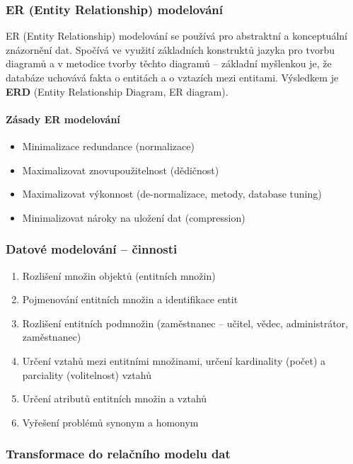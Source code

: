 \documentclass[12pt,a4paper]{article}
\begin{document}
\subsubsection{ER (Entity Relationship) modelování}

ER (Entity Relationship) modelování se používá pro abstraktní a konceptuální znázornění dat.
Spočívá ve využití základních konstruktů jazyka pro tvorbu diagramů a v metodice tvorby těchto
diagramů -- základní myšlenkou je, že databáze uchovává fakta o entitách a o vztazích mezi entitami.
Výsledkem je \textbf{ERD} (Entity Relationship Diagram, ER diagram).

\paragraph{Zásady ER modelování}
\begin{itemize}
  \item Minimalizace redundance (normalizace)
  \item Maximalizovat znovupoužitelnost (dědičnost)
  \item Maximalizovat výkonnost (de-normalizace, metody, database tuning)
  \item Minimalizovat nároky na uložení dat (compression)
\end{itemize}

\subsubsection{Datové modelování -- činnosti}

\begin{enumerate}
  \item Rozlišení množin objektů (entitních množin)
  \item Pojmenování entitních množin a identifikace entit
  \item Rozlišení entitních podmnožin (zaměstnanec -- učitel, vědec, administrátor, zaměstnanec)
  \item Určení vztahů mezi entitními množinami, určení kardinality (počet) a parciality
    (volitelnost) vztahů
  \item Určení atributů entitních množin a vztahů
  \item Vyřešení problémů synonym a homonym
\end{enumerate}

\subsubsection{Transformace do relačního modelu dat}
\end{document}
